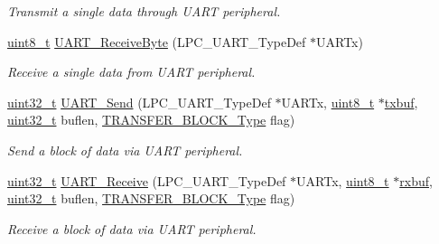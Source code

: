 \begin{DoxyCompactItemize}
\begin{DoxyCompactList}\small\item\em Transmit a single data through U\+A\+RT peripheral. \end{DoxyCompactList}\item 
\hyperlink{_p_e___types_8h_aba7bc1797add20fe3efdf37ced1182c5}{uint8\+\_\+t} \hyperlink{group___u_a_r_t___public___functions_gafbb690c2811d921f8c733888fdbfef54}{U\+A\+R\+T\+\_\+\+Receive\+Byte} (L\+P\+C\+\_\+\+U\+A\+R\+T\+\_\+\+Type\+Def $\ast$U\+A\+R\+Tx)
\begin{DoxyCompactList}\small\item\em Receive a single data from U\+A\+RT peripheral. \end{DoxyCompactList}\item 
\hyperlink{_p_e___types_8h_a33594304e786b158f3fb30289278f5af}{uint32\+\_\+t} \hyperlink{group___u_a_r_t___public___functions_gadeb1a6a95247931abb93fa49571ae51c}{U\+A\+R\+T\+\_\+\+Send} (L\+P\+C\+\_\+\+U\+A\+R\+T\+\_\+\+Type\+Def $\ast$U\+A\+R\+Tx, \hyperlink{_p_e___types_8h_aba7bc1797add20fe3efdf37ced1182c5}{uint8\+\_\+t} $\ast$\hyperlink{z1_2i2c_8c_a1516447e451c9d7b7faa91d54fdf0469}{txbuf}, \hyperlink{_p_e___types_8h_a33594304e786b158f3fb30289278f5af}{uint32\+\_\+t} buflen, \hyperlink{group___l_p_c___types___public___types_gaddb88bff95842be0c54e0e979f45cf95}{T\+R\+A\+N\+S\+F\+E\+R\+\_\+\+B\+L\+O\+C\+K\+\_\+\+Type} flag)
\begin{DoxyCompactList}\small\item\em Send a block of data via U\+A\+RT peripheral. \end{DoxyCompactList}\item 
\hyperlink{_p_e___types_8h_a33594304e786b158f3fb30289278f5af}{uint32\+\_\+t} \hyperlink{group___u_a_r_t___public___functions_ga83868ce3b59f46e618c4fc4d864895a1}{U\+A\+R\+T\+\_\+\+Receive} (L\+P\+C\+\_\+\+U\+A\+R\+T\+\_\+\+Type\+Def $\ast$U\+A\+R\+Tx, \hyperlink{_p_e___types_8h_aba7bc1797add20fe3efdf37ced1182c5}{uint8\+\_\+t} $\ast$\hyperlink{z1_2i2c_8c_ab49e2360f2f51e957ca2caff26725265}{rxbuf}, \hyperlink{_p_e___types_8h_a33594304e786b158f3fb30289278f5af}{uint32\+\_\+t} buflen, \hyperlink{group___l_p_c___types___public___types_gaddb88bff95842be0c54e0e979f45cf95}{T\+R\+A\+N\+S\+F\+E\+R\+\_\+\+B\+L\+O\+C\+K\+\_\+\+Type} flag)
\begin{DoxyCompactList}\small\item\em Receive a block of data via U\+A\+RT peripheral. \end{DoxyCompactList}\item 

\end{DoxyCompactItemize}
